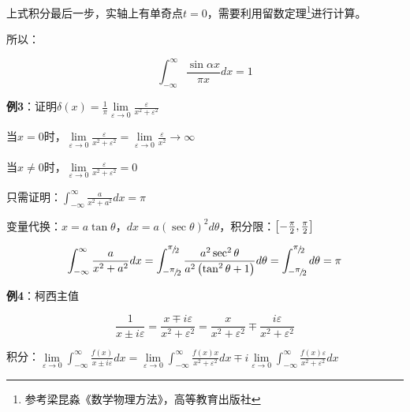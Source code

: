 上式积分最后一步，实轴上有单奇点$t=0$，需要利用留数定理\footnote{参考梁昆淼《数学物理方法》，高等教育出版社}进行计算。

所以：

\begin{equation}
\int_{ - \infty }^\infty  {\frac{{\sin \alpha x}}{{\pi x}}dx}  = 1
\end{equation}


\textbf{例3}：证明$\delta (x) = \frac{1}{\pi }\mathop {\lim }\limits_{\varepsilon  \to 0} \frac{\varepsilon }{{x^2  + \varepsilon ^2 }}$


当$x=0$时，$\mathop {\lim }\limits_{\varepsilon  \to 0} \frac{\varepsilon }{{x^2  + \varepsilon ^2 }} = \mathop {\lim }\limits_{\varepsilon  \to 0} \frac{\varepsilon }{{x^2 }} \to \infty $


当$x \ne 0$时，$\mathop {\lim }\limits_{\varepsilon  \to 0} \frac{\varepsilon }{{x^2  + \varepsilon ^2 }} = 0$

只需证明：$\int_{ - \infty }^\infty  {\frac{a}{{x^2  + a^2 }}dx}  = \pi $

变量代换：$x = a\tan \theta $，$dx = a(\sec \theta )^2 d\theta $，积分限：$\left[ { - {\textstyle{\pi  \over 2}},{\textstyle{\pi  \over 2}}} \right]$

\begin{equation*}
\int_{ - \infty }^\infty  {\frac{a}{{x^2  + a^2 }}dx}  = \int_{ - {\raise0.5ex\hbox{$\scriptstyle \pi $}
\kern-0.1em/\kern-0.15em
\lower0.25ex\hbox{$\scriptstyle 2$}}}^{{\raise0.5ex\hbox{$\scriptstyle \pi $}
\kern-0.1em/\kern-0.15em
\lower0.25ex\hbox{$\scriptstyle 2$}}} {\frac{{a^2 \sec ^2 \theta }}{{a^2 \left( {\tan ^2 \theta  + 1} \right)}}d\theta }  = \int_{ - {\raise0.5ex\hbox{$\scriptstyle \pi $}
\kern-0.1em/\kern-0.15em
\lower0.25ex\hbox{$\scriptstyle 2$}}}^{{\raise0.5ex\hbox{$\scriptstyle \pi $}
\kern-0.1em/\kern-0.15em
\lower0.25ex\hbox{$\scriptstyle 2$}}} {d\theta }  = \pi 
\end{equation*}

\textbf{例4}：柯西主值

\begin{equation}
\frac{1}{{x \pm i\varepsilon }} = \frac{{x \mp i\varepsilon }}{{x^2  + \varepsilon ^2 }} = \frac{x}{{x^2  + \varepsilon ^2 }} \mp \frac{{i\varepsilon }}{{x^2  + \varepsilon ^2 }}
\end{equation}

积分：$\mathop {\lim }\limits_{\varepsilon  \to 0} \int_{ - \infty }^\infty  {\frac{{f(x)}}{{x \pm i\varepsilon }}dx}  = \mathop {\lim }\limits_{\varepsilon  \to 0} \int_{ - \infty }^\infty  {\frac{{f(x)x}}{{x^2  + \varepsilon ^2 }}dx}  \mp i\mathop {\lim }\limits_{\varepsilon  \to 0} \int_{ - \infty }^\infty  {\frac{{f(x)\varepsilon }}{{x^2  + \varepsilon ^2 }}} dx$

